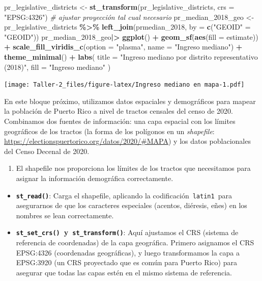 \documentclass[
]{article}
\newenvironment{Shaded}{\begin{snugshade}}{\end{snugshade}}
\newcommand{\AttributeTok}[1]{\textcolor[rgb]{0.13,0.29,0.53}{#1}}
\newcommand{\CommentTok}[1]{\textcolor[rgb]{0.56,0.35,0.01}{\textit{#1}}}
\newcommand{\FunctionTok}[1]{\textcolor[rgb]{0.13,0.29,0.53}{\textbf{#1}}}
\newcommand{\NormalTok}[1]{#1}
\newcommand{\OtherTok}[1]{\textcolor[rgb]{0.56,0.35,0.01}{#1}}
\newcommand{\SpecialCharTok}[1]{\textcolor[rgb]{0.81,0.36,0.00}{\textbf{#1}}}
\newcommand{\StringTok}[1]{\textcolor[rgb]{0.31,0.60,0.02}{#1}}
\providecommand{\tightlist}{%
  \setlength{\itemsep}{0pt}\setlength{\parskip}{0pt}}
\begin{document}
\begin{Shaded}
\begin{Highlighting}[]
\NormalTok{pr\_legislative\_districts }\OtherTok{\textless{}{-}} \FunctionTok{st\_transform}\NormalTok{(pr\_legislative\_districts, }\AttributeTok{crs =} \StringTok{"EPSG:4326"}\NormalTok{)  }\CommentTok{\# ajustar proyección tal cual necesario}
\NormalTok{pr\_median\_2018\_geo }\OtherTok{\textless{}{-}}\NormalTok{ pr\_legislative\_districts }\SpecialCharTok{\%\textgreater{}\%}
  \FunctionTok{left\_join}\NormalTok{(prmedian\_2018, }\AttributeTok{by =} \FunctionTok{c}\NormalTok{(}\StringTok{"GEOID"} \OtherTok{=} \StringTok{"GEOID"}\NormalTok{))  }
\NormalTok{pr\_median\_2018\_geo}\SpecialCharTok{|\textgreater{}}
  \FunctionTok{ggplot}\NormalTok{() }\SpecialCharTok{+}
  \FunctionTok{geom\_sf}\NormalTok{(}\FunctionTok{aes}\NormalTok{(}\AttributeTok{fill =}\NormalTok{ estimate)) }\SpecialCharTok{+}
  \FunctionTok{scale\_fill\_viridis\_c}\NormalTok{(}\AttributeTok{option =} \StringTok{"plasma"}\NormalTok{, }\AttributeTok{name =} \StringTok{"Ingreso mediano"}\NormalTok{) }\SpecialCharTok{+}
  \FunctionTok{theme\_minimal}\NormalTok{() }\SpecialCharTok{+}
  \FunctionTok{labs}\NormalTok{(}
    \AttributeTok{title =} \StringTok{"Ingreso mediano por distrito representativo (2018)"}\NormalTok{,}
    \AttributeTok{fill =} \StringTok{"Ingreso mediano"}
\NormalTok{  )}
\end{Highlighting}
\end{Shaded}

\texttt{[image: Taller-2\_files/figure-latex/Ingreso mediano en mapa-1.pdf]}

En este bloque próximo, utilizamos datos espaciales y demográficos para
mapear la población de Puerto Rico a nivel de tractos censales del censo
de 2020. Combinamos dos fuentes de información: una capa espacial con
los límites geográficos de los tractos (la forma de los polígonos en un
\emph{shapefile}:
\url{https://electionspuertorico.org/datos/2020/\#MAPA}) y los datos
poblacionales del Censo Decenal de 2020.

\begin{enumerate}
\def\labelenumi{\arabic{enumi}.}
\tightlist
\item
  El shapefile nos proporciona los límites de los tractos que
  necesitamos para asignar la información demográfica correctamente.
\end{enumerate}

\begin{itemize}
\item
  \textbf{\texttt{st\_read()}}: Carga el shapefile, aplicando la
  codificación~\texttt{latin1}~para asegurarnos de que los caracteres
  especiales (acentos, diéresis, eñes) en los nombres se lean
  correctamente.
\item
  \textbf{\texttt{st\_set\_crs()}~y~\texttt{st\_transform()}}: Aquí
  ajustamos el CRS (sistema de referencia de coordenadas) de la capa
  geográfica. Primero asignamos el CRS EPSG:4326 (coordenadas
  geográficas), y luego transformamos la capa a EPSG:3920 (un CRS
  proyectado que es común para Puerto Rico) para asegurar que todas las
  capas estén en el mismo sistema de referencia.
\end{itemize}
\end{document}
